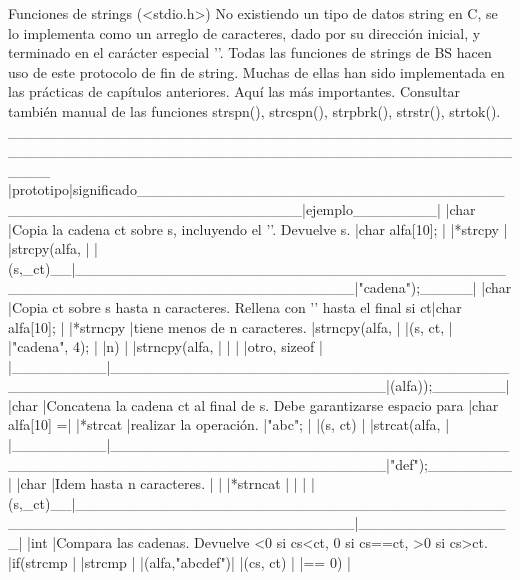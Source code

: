 Funciones de strings (<stdio.h>)
No existiendo un tipo de datos string en C, se lo implementa como un arreglo de
caracteres, dado por su dirección inicial, y terminado en el carácter especial
'\0'. Todas las funciones de strings de BS hacen uso de este protocolo de fin
de string. Muchas de ellas han sido implementada en las prácticas de capítulos
anteriores.
Aquí las más importantes. Consultar también manual de las funciones strspn(),
strcspn(), strpbrk(), strstr(), strtok().
 ____________________________________________________________________________________________________
|prototipo|significado_______________________________________________________________|ejemplo________|
|char     |Copia la cadena ct sobre s, incluyendo el '\0'. Devuelve s.               |char alfa[10]; |
|*strcpy  |                                                                          |strcpy(alfa,   |
|(s,_ct)__|__________________________________________________________________________|"cadena");_____|
|char     |Copia ct sobre s hasta n caracteres. Rellena con '\0' hasta el final si ct|char alfa[10]; |
|*strncpy |tiene menos de n caracteres.                                              |strncpy(alfa,  |
|(s, ct,  |                                                                          |"cadena", 4);  |
|n)       |                                                                          |strncpy(alfa,  |
|         |                                                                          |otro, sizeof   |
|_________|__________________________________________________________________________|(alfa));_______|
|char     |Concatena la cadena ct al final de s. Debe garantizarse espacio para      |char alfa[10] =|
|*strcat  |realizar la operación.                                                   |"abc";         |
|(s, ct)  |                                                                          |strcat(alfa,   |
|_________|__________________________________________________________________________|"def");________|
|char     |Idem hasta n caracteres.                                                  |               |
|*strncat |                                                                          |               |
|(s,_ct)__|__________________________________________________________________________|_______________|
|int      |Compara las cadenas. Devuelve <0 si cs<ct, 0 si cs==ct, >0 si cs>ct.      |if(strcmp      |
|strcmp   |                                                                          |(alfa,"abcdef")|
|(cs, ct) |                                                                          |== 0)          |
